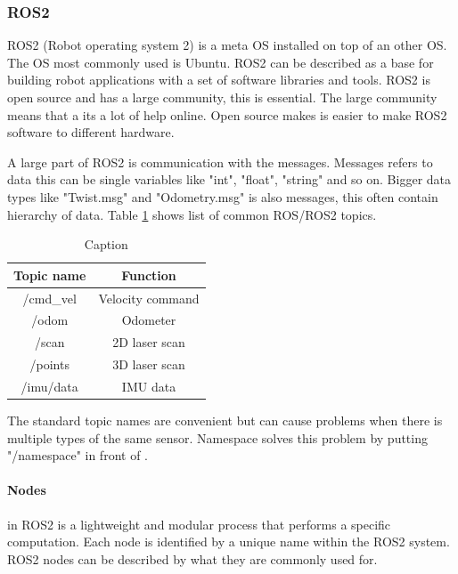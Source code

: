 \subsubsection{ROS2} 
ROS2 (Robot operating system 2) \cite{rosfoxydocs} is a meta OS installed on top of an other OS. The OS most commonly used is Ubuntu. ROS2 can be described as a base for building robot applications with a set of software libraries and tools. ROS2 is open source and has a large community, this is essential. The large community means that a its a lot of help online. Open source makes is easier to make ROS2 software to different hardware. 

A large part of ROS2 is communication with the messages. Messages refers to data this can be single variables like "int", "float", "string" and so on. Bigger data types like "Twist.msg" and "Odometry.msg" is also messages, this often contain hierarchy of data. 
Table \ref{tab:ROS2_topics} shows list of common ROS/ROS2 topics.
\begin{table}[H]
    \centering
    \begin{tabular}{c|c}
       Topic name       & Function          \\ \hline
        /cmd\_vel       & Velocity command  \\
        /odom           & Odometer          \\
        /scan           & 2D laser scan     \\
        /points         & 3D laser scan     \\        
        /imu/data       & IMU data          \\
    \end{tabular}
    \caption{Caption}
    \label{tab:ROS2_topics}
\end{table}

The standard topic names are convenient but can cause problems when there is multiple types of the same sensor. Namespace solves this problem by putting "/namespace" in front of .  

\paragraph{Nodes} in ROS2 is a lightweight and modular process that performs a specific computation. Each node is identified by a unique name within the ROS2 system. 
ROS2 nodes can be described by what they are commonly used for. 

